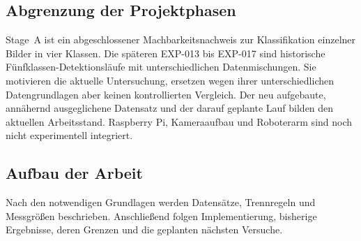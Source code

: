 \subsection{Abgrenzung der Projektphasen}
Stage~A ist ein abgeschlossener Machbarkeitsnachweis zur Klassifikation einzelner Bilder in vier Klassen. Die späteren EXP-013 bis EXP-017 sind historische Fünfklassen-Detektionsläufe mit unterschiedlichen Datenmischungen. Sie motivieren die aktuelle Untersuchung, ersetzen wegen ihrer unterschiedlichen Datengrundlagen aber keinen kontrollierten Vergleich. Der neu aufgebaute, annähernd ausgeglichene Datensatz und der darauf geplante Lauf bilden den aktuellen Arbeitsstand. Raspberry Pi, Kameraaufbau und Roboterarm sind noch nicht experimentell integriert.

\subsection{Aufbau der Arbeit}
Nach den notwendigen Grundlagen werden Datensätze, Trennregeln und Messgrößen beschrieben. Anschließend folgen Implementierung, bisherige Ergebnisse, deren Grenzen und die geplanten nächsten Versuche.
